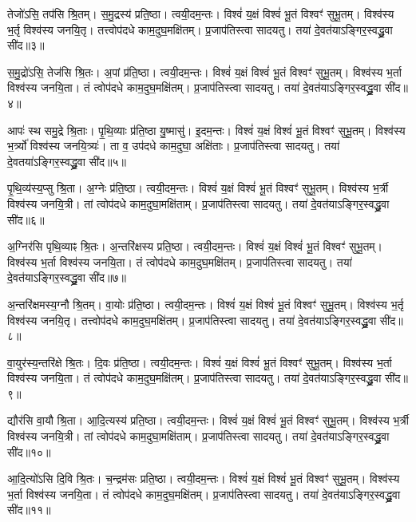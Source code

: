    तेजो॑ऽसि॒ तप॑सि श्रि॒तम्।
   स॒मु॒द्रस्य॑ प्रति॒ष्ठा।
   त्वयी॒दम॒न्तः।
   विश्वं॑ य॒क्षं विश्वं॑ भू॒तं विश्वꣳ॑ सुभू॒तम्।
   विश्व॑स्य भ॒र्तृ विश्व॑स्य जनयि॒तृ।
   तत्त्वोप॑दधे काम॒दुघ॒मक्षि॑तम्।
   प्र॒जाप॑तिस्त्वा सादयतु।
   तया॑ दे॒वत॑याऽङ्गिर॒स्वद्ध्रु॒वा सी॑द॥३॥

   स॒मु॒द्रो॑ऽसि॒ तेज॑सि श्रि॒तः।
   अ॒पां प्र॑ति॒ष्ठा।
   त्वयी॒दम॒न्तः।
   विश्वं॑ य॒क्षं विश्वं॑ भू॒तं विश्वꣳ॑ सुभू॒तम्।
   विश्व॑स्य भ॒र्ता विश्व॑स्य जनयि॒ता।
   तं त्वोप॑दधे काम॒दुघ॒मक्षि॑तम्।
   प्र॒जाप॑तिस्त्वा सादयतु।
   तया॑ दे॒वत॑याऽङ्गिर॒स्वद्ध्रु॒वा सी॑द॥४॥

   आपः॑ स्थ समु॒द्रे श्रि॒ताः।
   पृ॒थि॒व्याः प्र॑ति॒ष्ठा यु॒ष्मासु॑।
   इ॒दम॒न्तः।
   विश्वं॑ य॒क्षं विश्वं॑ भू॒तं विश्वꣳ॑ सुभू॒तम्।
   विश्व॑स्य भ॒र्त्र्यो॑ विश्व॑स्य जनयि॒त्र्यः॑।
   ता व॒ उप॑दधे काम॒दुघा॒ अक्षि॑ताः।
   प्र॒जाप॑तिस्त्वा सादयतु।
   तया॑ दे॒वतया॑ऽङ्गिर॒स्वद्ध्रु॒वा सी॑द॥५॥

   पृ॒थि॒व्य॑स्य॒प्सु श्रि॒ता।
   अ॒ग्नेः प्र॑ति॒ष्ठा।
   त्वयी॒दम॒न्तः।
   विश्वं॑ य॒क्षं विश्वं॑ भू॒तं विश्वꣳ॑ सुभू॒तम्।
   विश्व॑स्य भ॒र्त्री विश्व॑स्य जनयि॒त्री।
   तां त्वोप॑दधे काम॒दुघा॒मक्षि॑ताम्।
   प्र॒जाप॑तिस्त्वा सादयतु।
   तया॑ दे॒वत॑याऽङ्गिर॒स्वद्ध्रु॒वा सी॑द॥६॥

   अ॒ग्निर॑सि पृथि॒व्याꣴ श्रि॒तः।
   अ॒न्तरि॑क्षस्य प्रति॒ष्ठा।
   त्वयी॒दम॒न्तः।
   विश्वं॑ य॒क्षं विश्वं॑ भू॒तं विश्वꣳ॑ सुभू॒तम्।
   विश्व॑स्य भ॒र्ता विश्व॑स्य जनयि॒ता।
   तं त्वोप॑दधे काम॒दुघ॒मक्षि॑तम्।
   प्र॒जाप॑तिस्त्वा सादयतु।
   तया॑ दे॒वत॑याऽङ्गिर॒स्वद्ध्रु॒वा सी॑द॥७॥

   अ॒न्तरि॑क्षमस्य॒ग्नौ श्रि॒तम्।
   वा॒योः प्र॑ति॒ष्ठा।
   त्वयी॒दम॒न्तः।
   विश्वं॑ य॒क्षं विश्वं॑ भू॒तं विश्वꣳ॑ सुभू॒तम्।
   विश्व॑स्य भ॒र्तृ विश्व॑स्य जनयि॒तृ।
   तत्त्वोप॑दधे काम॒दुघ॒मक्षि॑तम्।
   प्र॒जाप॑तिस्त्वा सादयतु।
   तया॑ दे॒वत॑याऽङ्गिर॒स्वद्ध्रु॒वा सी॑द॥८॥

   वा॒युर॑स्य॒न्तरि॑क्षे श्रि॒तः।
   दि॒वः प्र॑ति॒ष्ठा।
   त्वयी॒दम॒न्तः।
   विश्वं॑ य॒क्षं विश्वं॑ भू॒तं विश्वꣳ॑ सुभू॒तम्।
   विश्व॑स्य भ॒र्ता विश्व॑स्य जनयि॒ता।
   तं त्वोप॑दधे काम॒दुघ॒मक्षि॑तम्।
   प्र॒जाप॑तिस्त्वा सादयतु।
   तया॑ दे॒वत॑याऽङ्गिर॒स्वद्ध्रु॒वा सी॑द॥९॥

   द्यौर॑सि वा॒यौ श्रि॒ता।
   आ॒दि॒त्यस्य॑ प्रति॒ष्ठा।
   त्वयी॒दम॒न्तः।
   विश्वं॑ य॒क्षं विश्वं॑ भू॒तं विश्वꣳ॑ सुभू॒तम्।
   विश्व॑स्य भ॒र्त्री विश्व॑स्य जनयि॒त्री।
   तां त्वोप॑दधे काम॒दुघा॒मक्षि॑ताम्।
   प्र॒जाप॑तिस्त्वा सादयतु।
   तया॑ दे॒वत॑याऽङ्गिर॒स्वद्ध्रु॒वा सी॑द॥१०॥

   आ॒दि॒त्यो॑ऽसि दि॒वि श्रि॒तः।
   च॒न्द्रम॑सः प्रति॒ष्ठा।
   त्वयी॒दम॒न्तः।
   विश्वं॑ य॒क्षं विश्वं॑ भू॒तं विश्वꣳ॑ सुभू॒तम्।
   विश्व॑स्य भ॒र्ता विश्व॑स्य जनयि॒ता।
   तं त्वोप॑दधे काम॒दुघ॒मक्षि॑तम्।
   प्र॒जाप॑तिस्त्वा सादयतु।
   तया॑ दे॒वत॑याऽङ्गिर॒स्वद्ध्रु॒वा सी॑द॥११॥

